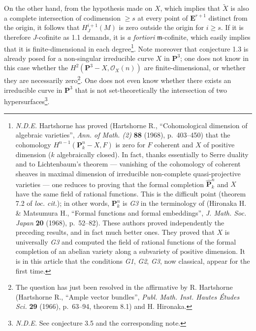 \documentclass[
  11pt,
  a4paper,
]{book}
\begin{document}
On the other hand, from the hypothesis made on \(X\), which implies that
\(\tilde{X}\) is also a complete intersection of codimension
\(\geqslant s\) at every point of \(\mathbf{E}^{r+1}\) distinct from the
origin, it follows that \(H^{i+1}_{J}(M)\) is zero outside the origin
for \(i \geqslant s\). If it is therefore \(J\)-cofinite as 1.1 demands,
it is \emph{a fortiori} \(\mathfrak{m}\)-cofinite, which easily implies
that it is finite-dimensional in each degree\footnote{\emph{N.D.E.}
  Hartshorne has proved (Hartshorne R., ``Cohomological dimension of
  algebraic varieties'', \emph{Ann. of Math. (2)} \textbf{88} (1968),
  p.~403--450) that the cohomology
  \(H^{n-1}(\mathbf{P}^{n}_{k} - X, F)\) is zero for \(F\) coherent and
  \(X\) of positive dimension (\(k\) algebraically closed). In fact,
  thanks essentially to Serre duality and to Lichtenbaum's theorem ---
  vanishing of the cohomology of coherent sheaves in maximal dimension
  of irreducible non-complete quasi-projective varieties --- one reduces
  to proving that the formal completion \(\hat{\mathbf{P}}^{n}_{k}\) and
  \(X\) have the same field of rational functions. This is the difficult
  point (theorem 7.2 of \emph{loc. cit.}); in other words,
  \(\mathbf{P}^{n}_{k}\) is \emph{G3} in the terminology of (Hironaka H.
  \& Matsumura H., ``Formal functions and formal embeddings'', \emph{J.
  Math. Soc. Japan} \textbf{20} (1968), p.~52--82). These authors proved
  independently the preceding results, and in fact much better ones.
  They proved that \(X\) is universally \emph{G3} and computed the field
  of rational functions of the formal completion of an abelian variety
  along a subvariety of positive dimension. It is in this article that
  the conditions \emph{G1}, \emph{G2}, \emph{G3}, now classical, appear
  for the first time.}. Note moreover that conjecture 1.3 is already
posed for a non-singular irreducible curve \(X\) in \(\mathbf{P}^{3}\);
one does not know in this case whether the
\(H^{2}(\mathbf{P}^{3} - X, \mathcal{O}_{X}(n))\) are
finite-dimensional, or whether they are necessarily zero\footnote{The
  question has just been resolved in the affirmative by R. Hartshorne
  (Hartshorne R., ``Ample vector bundles'', \emph{Publ. Math. Inst.
  Hautes Études Sci.} \textbf{29} (1966), p.~63--94, theorem 8.1) and H.
  Hironaka.}. One does not even know whether there exists an irreducible
curve in \(\mathbf{P}^{3}\) that is not set-theoretically the
intersection of two hypersurfaces\footnote{\emph{N.D.E.} See conjecture
  3.5 and the corresponding note.}.
\end{document}
